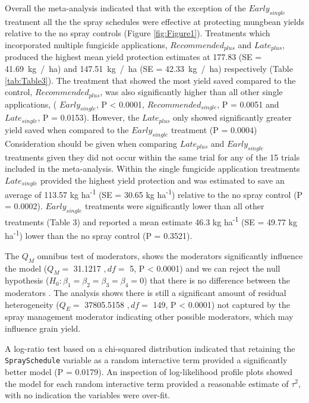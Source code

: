 \documentclass[agronomy,article,submit,moreauthors,pdftex]{mdpi}
\begin{document}
Overall the meta-analysis indicated that with the exception of the \(Early_{single}\) treatment all the the spray schedules were effective at protecting mungbean yields relative to the no spray controls (Figure \ref{fig:Figure1}).
Treatments which incorporated multiple fungicide applications, \(Recommended_{plus}\) and \(Late_{plus}\), produced the highest mean yield protection estimates at 177.83 (SE = 41.69~kg~/~ha) and 147.51~kg~/~ha (SE = 42.33~kg~/~ha) respectively (Table \ref{tab:Table3}).
The treatment that showed the most yield saved compared to the control, \(Recommended_{plus}\), was also significantly higher than all other single applications, (
\(Early_{single}\), P \textless{} 0.0001,
\(Recommended_{single}\), P = 0.0051 and
\(Late_{single}\), P = 0.0153).
However, the \(Late_{plus}\) only showed significantly greater yield saved when compared to the \(Early_{single}\) treatment (P = 0.0004)
Consideration should be given when comparing \(Late_{plus}\) and \(Early_{single}\) treatments given they did not occur within the same trial for any of the 15 trials included in the meta-analysis.
Within the single fungicide application treatments \(Late_{single}\) provided the highest yield protection and was estimated to save an average of 113.57 kg ha\textsuperscript{-1} (SE = 30.65 kg ha\textsuperscript{-1}) relative to the no spray control (P = 0.0002).
\(Early_{single}\) treatments were significantly lower than all other treatments (Table 3) and reported a mean estimate 46.3 kg ha\textsuperscript{-1} (SE = 49.77 kg ha\textsuperscript{-1}) lower than the no spray control (P = 0.3521).

The \(Q_M\) omnibus test of moderators, shows the moderators significantly influence the model (\(Q_M =\) 31.1217 \(,df =\) 5, P \textless{} 0.0001) and we can reject the null hypothesis (\(H_0 : \beta_1 = \beta_2 = \beta_3 =\beta_4 = 0\)) that there is no difference between the moderators \citep{Viechtbauer2010}.
The analysis shows there is still a significant amount of residual heterogeneity (\(Q_E =\) 37805.5158 \(,df=\) 149, P \textless{} 0.0001) not captured by the spray management moderator indicating other possible moderators, which may influence grain yield.

A log-ratio test based on a chi-squared distribution indicated that retaining the \texttt{SpraySchedule} variable as a random interactive term provided a significantly better model (P = 0.0179).
An inspection of log-likelihood profile plots showed the model for each random interactive term provided a reasonable estimate of \(\tau^2\), with no indication the variables were over-fit.
\end{document}
